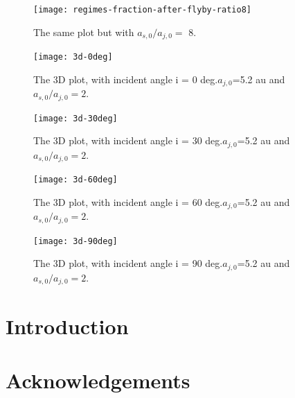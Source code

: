 \documentclass[fleqn,usenatbib,useAMS]{mnras}
\begin{document}
\begin{figure}
	\texttt{[image: regimes-fraction-after-flyby-ratio8]}
	\caption{The same plot but with $a_{s,0}/a_{j,0}=${\color{red} 8}.}
	\label{fig:schematics}
\end{figure}



\begin{figure}
	\texttt{[image: 3d-0deg]}
	\caption{The 3D plot, with {\color{red}incident angle i = 0 deg}.$a_{j,0}$=5.2 au and $a_{s,0}/a_{j,0}=2$.}
	\label{fig:schematics}
\end{figure}

\begin{figure}
	\texttt{[image: 3d-30deg]}
	\caption{The 3D plot, with {\color{red}incident angle i = 30 deg}.$a_{j,0}$=5.2 au and $a_{s,0}/a_{j,0}=2$.}
	\label{fig:schematics}
\end{figure}


\begin{figure}
	\texttt{[image: 3d-60deg]}
	\caption{The 3D plot, with {\color{red}incident angle i = 60 deg}.$a_{j,0}$=5.2 au and $a_{s,0}/a_{j,0}=2$.}
	\label{fig:schematics}
\end{figure}

\begin{figure}
	\texttt{[image: 3d-90deg]}
	\caption{The 3D plot, with {\color{red}incident angle i = 90 deg}.$a_{j,0}$=5.2 au and $a_{s,0}/a_{j,0}=2$.}
	\label{fig:schematics}
\end{figure}





\begingroup
\let\clearpage\relax
\tableofcontents
\endgroup
\newpage

\section{Introduction}





\section*{Acknowledgements}
\end{document}
